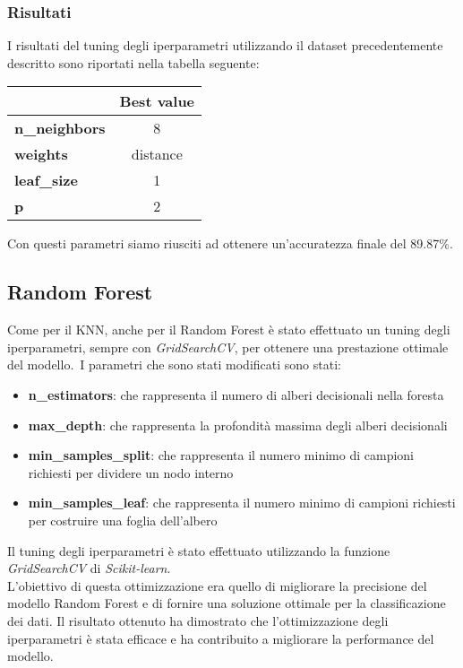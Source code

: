 \documentclass[../../Report.tex]{subfiles}
\begin{document}
\subsubsection{Risultati}
I risultati del tuning degli iperparametri utilizzando il dataset precedentemente descritto sono riportati nella tabella seguente:

\begin{table}[H]
    \centering
    \begin{tabular}{|l|c|}
        \hline
         & \textbf{Best value} \\
        \hline
        \textbf{n\_neighbors} & 8 \\
        \hline
        \textbf{weights} & distance \\
        \hline
        \textbf{leaf\_size} & 1 \\
        \hline
        \textbf{p} & 2 \\
        \hline
    \end{tabular}
\end{table}

Con questi parametri siamo riusciti ad ottenere un'accuratezza finale del 89.87\%.\\

\subsection{Random Forest}
Come per il KNN, anche per il Random Forest è stato effettuato un tuning degli iperparametri, sempre con \emph{GridSearchCV}, per ottenere una prestazione ottimale del modello.\
I parametri che sono stati modificati sono stati:
\begin{itemize}
\item \textbf{n\_estimators}: che rappresenta il numero di alberi decisionali nella foresta
\item \textbf{max\_depth}: che rappresenta la profondità massima degli alberi decisionali
\item \textbf{min\_samples\_split}: che rappresenta il numero minimo di campioni richiesti per dividere un nodo interno
\item \textbf{min\_samples\_leaf}: che rappresenta il numero minimo di campioni richiesti per costruire una foglia dell'albero
\end{itemize}
Il tuning degli iperparametri è stato effettuato utilizzando la funzione \emph{GridSearchCV} di \emph{Scikit-learn}.\\
L'obiettivo di questa ottimizzazione era quello di migliorare la precisione del modello Random Forest e di fornire una soluzione ottimale per la classificazione dei dati. Il risultato ottenuto ha dimostrato che l'ottimizzazione degli iperparametri è stata efficace e ha contribuito a migliorare la performance del modello.
\end{document}
